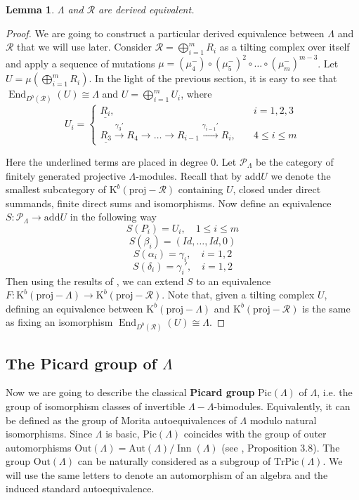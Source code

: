 \documentclass[12pt]{amsart}
\theoremstyle{plain}
\newtheorem{lemma}{Lemma}%
\theoremstyle{remark}
\theoremstyle{definition}
\newcommand{\End}{\mathop{\mathrm{End}}\nolimits}
\newcommand{\proj}{{\mathrm{proj}}}
\newcommand{\Aut}{{\mathrm{Aut}}}
\newcommand{\add}{{\mathrm{add}}}
\newcommand{\Out}{{\mathrm{Out}}}
\newcommand{\Inn}{\mathop{\mathrm{Inn}}\nolimits}
\newcommand{\Pic}{{\mathrm{Pic}}}
\newcommand{\TrPic}{{\mathrm{TrPic}}}
\newcommand{\K}{{\mathrm{K}}}
\begin{document}
\begin{lemma}\label{thm:equiv} $\Lambda$ and $\mathcal{R}$ are derived equivalent. 
\end{lemma} 

\begin{proof} We are going to construct a particular derived equivalence between $\Lambda$ and $\mathcal{R}$ that we will use later. Consider $\mathcal{R} = \bigoplus_{i=1}^m R_i$ as a tilting complex over itself and apply a sequence of mutations ${\mu = (\mu_4^-) \circ (\mu_5^-)^2 \circ\dots\circ(\mu_m^-)^{m-3}}$. Let ${U = \mu(\bigoplus_{i=1}^m R_i)}$. In the light of the previous section, it is easy to see that ${\End_{D^b(\mathcal{R})}(U) \cong \Lambda}$ and ${U = \bigoplus_{i=1}^m U_i}$, where 
$$ U_i = \begin{cases} \underline{R_i}, & \quad i = 1,2,3 \\ \underline{R_3} \xrightarrow{\gamma_3'} R_4 \xrightarrow{} \dots \xrightarrow{} R_{i-1} \xrightarrow{\gamma_{i-1}'} R_i, &  \quad 4 \leq i \leq m \end{cases} $$

Here the underlined terms are placed in degree $0$. Let $ \mathcal{P}_{\Lambda}$ be the category of finitely generated projective $\Lambda$-modules. Recall that by $\add U$ we denote the smallest subcategory of $\K^b(\proj-\mathcal{R})$ containing $U$, closed under direct summands, finite direct sums and isomorphisms. Now define an equivalence ${S \colon \mathcal{P}_{\Lambda} \to \add U}$ in the following way 
$$S(P_i) = U_i, \quad 1 \leq i \leq m $$
    $$S(\beta_i) = (Id, \dots, Id, 0)$$ 
    $$S(\alpha_i) = \gamma_i, \quad i = 1,2$$ 
    $$S(\delta_i) = \gamma_i', \quad i=1,2$$
Then using the results of \cite{R}, we can extend $S$ to an equivalence ${F \colon \K^b(\proj-\Lambda) \to \K^b(\proj-\mathcal{R})}$. Note that, given a tilting complex $U$, defining an equivalence between $\K^b(\proj-\Lambda)$ and $\K^b(\proj-\mathcal{R})$ is the same as fixing an isomorphism ${\End_{D^b(\mathcal{R})}(U) \cong \Lambda}$. 
\end{proof} 

\subsection{The Picard group of \texorpdfstring{$\Lambda$}{Lg}} 
Now we are going to describe the classical {\bf Picard group} $\Pic(\Lambda)$ of $\Lambda$, i.e. the group of isomorphism classes of invertible $\Lambda- \Lambda$-bimodules. Equivalently, it can be defined as the group of Morita autoequivalences of $\Lambda$ modulo natural isomorphisms. Since $\Lambda$ is basic, $\Pic(\Lambda)$ coincides with the group of outer automorphisms $\Out(\Lambda) = \Aut(\Lambda)/\Inn(\Lambda)$ (see \cite{B}, Proposition 3.8). The group $\Out(\Lambda)$ can be naturally considered as a subgroup of $\TrPic(\Lambda)$. We will use the same letters to denote an automorphism of an algebra and the induced standard autoequivalence.
\end{document}
